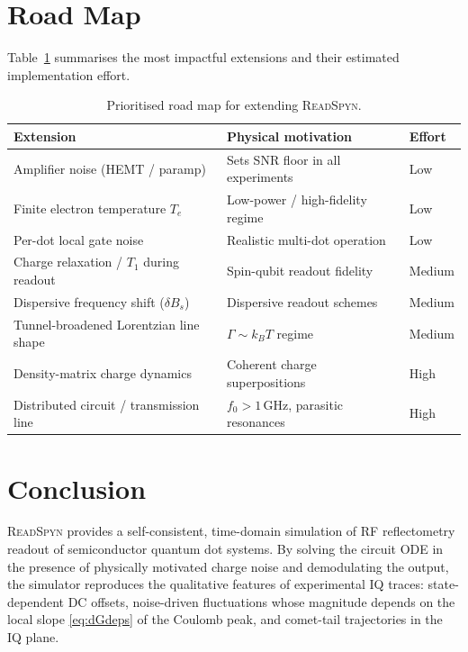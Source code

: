 \documentclass[11pt,a4paper]{article}
\begin{document}
\section{Road Map}

Table~\ref{tab:roadmap} summarises the most impactful extensions and their
estimated implementation effort.

\begin{table}[H]
\centering
\renewcommand{\arraystretch}{1.3}
\begin{tabular}{lll}
\toprule
Extension & Physical motivation & Effort \\
\midrule
Amplifier noise (HEMT / paramp)           & Sets SNR floor in all experiments       & Low    \\
Finite electron temperature $T_e$          & Low-power / high-fidelity regime        & Low    \\
Per-dot local gate noise                   & Realistic multi-dot operation           & Low    \\
Charge relaxation / $T_1$ during readout   & Spin-qubit readout fidelity             & Medium \\
Dispersive frequency shift ($\delta B_s$)  & Dispersive readout schemes              & Medium \\
Tunnel-broadened Lorentzian line shape     & $\Gamma\sim k_BT$ regime               & Medium \\
Density-matrix charge dynamics             & Coherent charge superpositions          & High   \\
Distributed circuit / transmission line    & $f_0>1$\,GHz, parasitic resonances     & High   \\
\bottomrule
\end{tabular}
\caption{Prioritised road map for extending \textsc{ReadSpyn}.}
\label{tab:roadmap}
\end{table}

\section{Conclusion}

\textsc{ReadSpyn} provides a self-consistent, time-domain simulation of RF
reflectometry readout of semiconductor quantum dot systems.
By solving the circuit ODE in the presence of physically motivated charge
noise and demodulating the output, the simulator reproduces the qualitative
features of experimental IQ traces: state-dependent DC offsets, noise-driven
fluctuations whose magnitude depends on the local slope \eqref{eq:dGdeps} of
the Coulomb peak, and comet-tail trajectories in the IQ plane.
\end{document}
